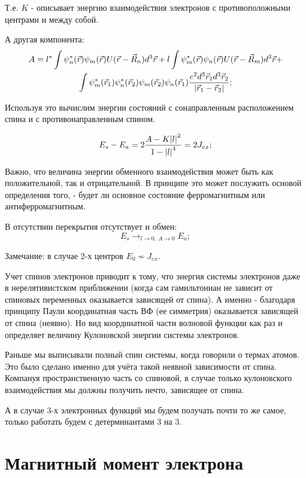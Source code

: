 \documentclass[a4paper, 14pt, russian]{article}
\newcommand{\be}{\begin{equation}}
\newcommand{\ee}{\end{equation}}
\begin{document}
	Т.е. $K$ - описывает энергию взаимодействия электронов
	с противоположными центрами и между собой.

	А другая компонента:
	\begin{multline}
		A = l^{*} \int \psi_n^{*} (\vec r) \psi_m (\vec r) U(\vec r - \vec{R}_n) d^3 \vec r + 
			l \int \psi_m^{*} (\vec r) \psi_n (\vec r) U(\vec r - \vec{R}_m) d^3 \vec r +\\
			\int \psi_m^{*}(\vec{r}_1) \psi_n^{*}(\vec{r}_2) \psi_m(\vec{r}_2) \psi_n(\vec{r}_1)
			\frac{e^2 d^3 \vec{r}_1 d^3 \vec{r}_2}{\abs{\vec{r}_1 - \vec{r}_2}}; 
	\end{multline}

	Используя это вычислим энергии состояний с сонаправленным расположением спина и с противонаправленным
	спином.

	\be
		E_s - E_a = 2\frac{A - K \abs{l}^2}{1 - \abs{l}^4} = 2J_{ex};
	\ee

	Важно, что величина энергии обменного взаимодействия может быть как положительной, так
	и отрицательной. В принципе это может послужить основой определения того,
	- будет ли основное состояние ферромагнитным или антиферромагнитным.

	В отсутствии перекрытия отсутствует и обмен:
	\be
		E_s \rightarrow_{l\rightarrow 0,~A\rightarrow 0} E_a;
	\ee

	Замечание: в случае 2-х центров $E_0 \nsim J_{ex}$.

	Учет спинов электронов приводит к тому, что энергия системы электронов 
	даже в нерелятивистском приближении (когда сам гамильтониан не зависит
	от спиновых переменных оказывается зависящей от спина). А именно - 
	благодаря принципу Паули координатная часть ВФ (ее симметрия)
	оказывается зависящей от спина (неявно).
	Но вид координатной части волновой функции как раз и определяет величину 
	Кулоновской энергии системы электронов.

	Раньше мы выписывали полный спин системы, когда говорили о термах
	атомов. Это было сделано именно для учёта такой неявной зависимости
	от спина. Компануя пространственную часть со спиновой, в случае только 
	кулоновского взаимодействия мы должны получить нечто, зависящее от спина.

	А в случае 3-х электронных функций мы будем получать почти то же самое, 
	только работать будем с детерминантами 3 на 3.

	\section{Магнитный момент электрона}
\end{document}
